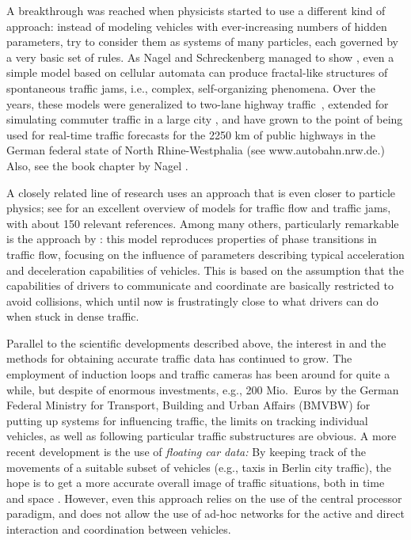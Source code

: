 \documentclass{acmrip}
\begin{document}
A breakthrough was reached when physicists started to use a
different kind of approach: instead of modeling vehicles with
ever-increasing numbers of hidden parameters, try to consider them
as systems of many particles, each governed by a very basic set of
rules. As Nagel and Schreckenberg managed to show \cite{ns-caft-92},
even a simple model based on cellular automata can produce
fractal-like structures of spontaneous traffic jams, i.e., complex,
self-organizing phenomena. Over the years, these models
\cite{n-hsmtf-95} were generalized to two-lane highway
traffic~\cite{rns-tltsc-96}, extended for simulating commuter
traffic in a large city \cite{rn-estsd-97}, and have grown
\cite{n-cata-02} to the point of being used for real-time traffic
forecasts for the 2250 km of public highways in the German federal
state of North Rhine-Westphalia \cite{kfc-osfnn-00,phc-tsann-03}
(see www.autobahn.nrw.de.) Also, see the book chapter
by Nagel \cite{n-tn-03}.

A closely related line of research uses an approach that is even
closer to particle physics; see \cite{nww-sfatf-03} for an excellent
overview of models for traffic flow and traffic jams, with about 150
relevant references. Among many others, particularly remarkable is
the approach by \cite{k-mmtfi-97}: this model reproduces properties
of phase transitions in traffic flow, focusing on the influence of
parameters describing typical acceleration and deceleration
capabilities of vehicles. This is based on the assumption that the
capabilities of drivers to communicate and coordinate are basically
restricted to avoid collisions, which until now is frustratingly
close to what drivers can do when stuck in dense traffic.

Parallel to the scientific developments described above, the
interest in and the methods for obtaining accurate traffic data has
continued to grow. The employment of induction loops and traffic
cameras has been around for quite a while, but despite of enormous
investments, e.g., 200 Mio.\ Euros by the German Federal Ministry
for Transport, Building and Urban Affairs (BMVBW) \cite{bmv-pvb-02} for
putting up systems for influencing traffic, the limits on tracking
individual vehicles, as well as following particular traffic
substructures are obvious. A more recent development is the use of
{\em floating car data:} By keeping track of the movements of a
suitable subset of vehicles (e.g., taxis in Berlin city traffic),
the hope is to get a more accurate overall image of traffic
situations, both in time and space \cite{kl-fcdau-00}. However, even
this approach relies on the use of the central processor paradigm,
and does not allow the use of ad-hoc networks for the active and
direct interaction and coordination between vehicles.
\end{document}

